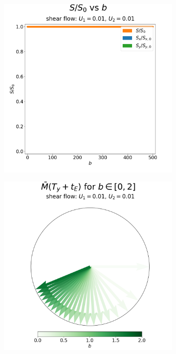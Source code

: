\begin{figure}
\begin{subfigure}{0.4\textwidth}
                        \includegraphics[width=\textwidth]{diagrams/results-mri/simple-tests/mri-spins_sall-vs-b_2D_shear_test_3.png}
                        \caption{}
                        \label{fig:mri-shear-3:s-vs-b}
                    \end{subfigure}
                    \begin{subfigure}{0.4\textwidth}
                        \centering
                        \includegraphics[width=\textwidth]{diagrams/results-mri/simple-tests/mri-spins_b_2D_shear_test_3.png}

\end{subfigure}
\end{figure}
